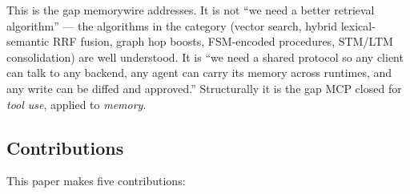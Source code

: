 \documentclass[11pt,letterpaper,twocolumn]{article}
\begin{document}
This is the gap memorywire addresses. It is not ``we need a better retrieval algorithm'' --- the algorithms in the category (vector search, hybrid lexical-semantic RRF fusion, graph hop boosts, FSM-encoded procedures, STM/LTM consolidation) are well understood. It is ``we need a shared protocol so any client can talk to any backend, any agent can carry its memory across runtimes, and any write can be diffed and approved.'' Structurally it is the gap MCP closed for \emph{tool use}, applied to \emph{memory}.

\subsection{Contributions}
\label{sec:intro-contributions}

This paper makes five contributions:
\end{document}
